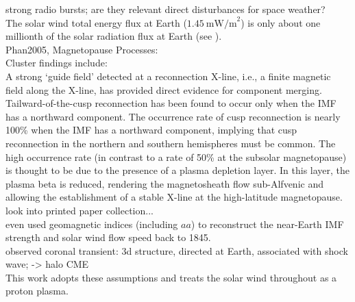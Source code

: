 strong radio bursts; are they relevant direct disturbances for space weather?\\

The solar wind total energy flux at Earth ($1.45~\text{mW/m}^2$) is only about one millionth of the solar radiation flux at Earth (see \citet[p.~153]{Schwenn1990}).\\

Phan2005, Magnetopause Processes:\\
Cluster findings include:\\
A strong ‘guide field’ detected at a reconnection X-line, i.e., a finite magnetic field along the X-line, has provided direct evidence for component merging.\\
Tailward-of-the-cusp reconnection has been found to occur only when the IMF has a northward component. The occurrence rate of cusp reconnection is nearly 100\% when the IMF has a northward component, implying that cusp reconnection in the northern and southern hemispheres must be common. The high occurrence rate (in contrast to a rate of 50\% at the subsolar magnetopause) is thought to be due to the presence of a plasma depletion layer. In this layer, the plasma beta is reduced, rendering the magnetosheath flow sub-Alfvenic and allowing the establishment of a stable X-line at the high-latitude magnetopause.\\

look into printed paper collection...\\

\citet{Lockwood2014} even used geomagnetic indices (including $aa$) to reconstruct the near-Earth IMF strength and solar wind flow speed back to 1845.\\

observed coronal transient: 3d structure, directed at Earth, associated with shock wave; \citep{Howard1982} -> halo CME\\

This work adopts these assumptions and treats the solar wind throughout as a proton plasma.\\


